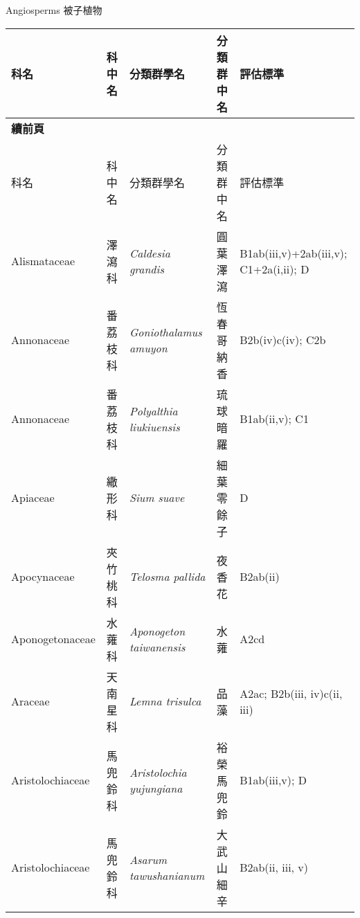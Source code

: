 \noindent\normalfont\selectfont Angiosperms 被子植物
\footnotesize\selectfont
        {\def\arraystretch{1.5}\tabcolsep=2pt
        \begin{longtable}{p{2.5cm}p{2.5cm}p{4.5cm}p{2.5cm}p{3cm}}
        \toprule
          科名 & 科中名 & 分類群學名 & 分類群中名 & 評估標準 \\
        \midrule 
        \endfirsthead

        {{\bfseries 續前頁 }} \\
        科名 & 科中名 & 分類群學名 & 分類群中名 & 評估標準 \\
        \midrule
        \endhead
                Alismataceae & 澤瀉科 & \textit{Caldesia grandis}  & 圓葉澤瀉 & B1ab(iii,v)+2ab(iii,v); C1+2a(i,ii); D \index{Caldesia@\textit{Caldesia}!grandis@\textit{grandis}}  \index{圓葉澤瀉} \\
    Annonaceae & 番荔枝科 & \textit{Goniothalamus amuyon}  & 恆春哥納香 & B2b(iv)c(iv); C2b \index{Goniothalamus@\textit{Goniothalamus}!amuyon@\textit{amuyon}}  \index{恆春哥納香} \\
    Annonaceae & 番荔枝科 & \textit{Polyalthia liukiuensis}  & 琉球暗羅 & B1ab(ii,v); C1 \index{Polyalthia@\textit{Polyalthia}!liukiuensis@\textit{liukiuensis}}  \index{琉球暗羅} \\
    Apiaceae & 繖形科 & \textit{Sium suave}  & 細葉零餘子 & D \index{Sium@\textit{Sium}!suave@\textit{suave}}  \index{細葉零餘子} \\
    Apocynaceae & 夾竹桃科 & \textit{Telosma pallida}  & 夜香花 & B2ab(ii) \index{Telosma@\textit{Telosma}!pallida@\textit{pallida}}  \index{夜香花} \\
    Aponogetonaceae & 水蕹科 & \textit{Aponogeton taiwanensis}  & 水蕹 & A2cd \index{Aponogeton@\textit{Aponogeton}!taiwanensis@\textit{taiwanensis}}  \index{水蕹} \\
    Araceae & 天南星科 & \textit{Lemna trisulca}  & 品藻 & A2ac; B2b(iii, iv)c(ii, iii) \index{Lemna@\textit{Lemna}!trisulca@\textit{trisulca}}  \index{品藻} \\
    Aristolochiaceae & 馬兜鈴科 & \textit{Aristolochia yujungiana}  & 裕榮馬兜鈴 & B1ab(iii,v); D \index{Aristolochia@\textit{Aristolochia}!yujungiana@\textit{yujungiana}}  \index{裕榮馬兜鈴} \\
    Aristolochiaceae & 馬兜鈴科 & \textit{Asarum tawushanianum}  & 大武山細辛 & B2ab(ii, iii, v) \index{Asarum@\textit{Asarum}!tawushanianum@\textit{tawushanianum}}  \index{大武山細辛} \\

\end{longtable}}

